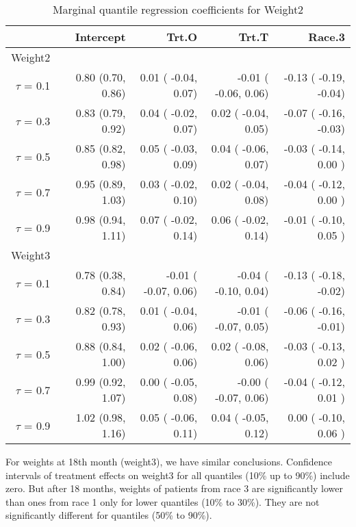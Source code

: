 \documentclass[12pt]{article}
\begin{document}
\begin{table}[ht]
  \renewcommand{\arraystretch}{1.3}
  \begin{center}
    \caption{Marginal quantile regression coefficients for
      Weight2}\label{tab:w2}
    \vspace{10pt}
    \begin{tabular}{rrrrr}
      \toprule
      & Intercept         & Trt.O                & Trt.T                & Race.3                \\
      \hline
      Weight2      &                   &                      &                      &                       \\
      $\tau$ = 0.1 & 0.80 (0.70, 0.86) & 0.01  ( -0.04, 0.07) & -0.01 ( -0.06, 0.06) & -0.13 ( -0.19, -0.04) \\
      $\tau$ = 0.3 & 0.83 (0.79, 0.92) & 0.04  ( -0.02, 0.07) & 0.02  ( -0.04, 0.05) & -0.07 ( -0.16, -0.03) \\
      $\tau$ = 0.5 & 0.85 (0.82, 0.98) & 0.05  ( -0.03, 0.09) & 0.04  ( -0.06, 0.07) & -0.03 ( -0.14, 0.00 ) \\
      $\tau$ = 0.7 & 0.95 (0.89, 1.03) & 0.03  ( -0.02, 0.10) & 0.02  ( -0.04, 0.08) & -0.04 ( -0.12, 0.00 ) \\
      $\tau$ = 0.9 & 0.98 (0.94, 1.11) & 0.07  ( -0.02, 0.14) & 0.06  ( -0.02, 0.14) & -0.01 ( -0.10, 0.05 ) \\
      Weight3      &                   &                      &                      &                       \\
      $\tau$ = 0.1 & 0.78 (0.38, 0.84) & -0.01 ( -0.07, 0.06) & -0.04 ( -0.10, 0.04) & -0.13 ( -0.18, -0.02) \\
      $\tau$ = 0.3 & 0.82 (0.78, 0.93) & 0.01  ( -0.04, 0.06) & -0.01 ( -0.07, 0.05) & -0.06 ( -0.16, -0.01) \\
      $\tau$ = 0.5 & 0.88 (0.84, 1.00) & 0.02  ( -0.06, 0.06) & 0.02  ( -0.08, 0.06) & -0.03 ( -0.13, 0.02 ) \\
      $\tau$ = 0.7 & 0.99 (0.92, 1.07) & 0.00  ( -0.05, 0.08) & -0.00 ( -0.07, 0.06) & -0.04 ( -0.12, 0.01 ) \\
      $\tau$ = 0.9 & 1.02 (0.98, 1.16) & 0.05  ( -0.06, 0.11) & 0.04  ( -0.05, 0.12) & 0.00  ( -0.10, 0.06 ) \\
      \bottomrule
    \end{tabular}
  \end{center}
\end{table}

For weights at 18th month (weight3), we have similar
conclusions. Confidence intervals of treatment effects on weight3 for
all quantiles (10\% up to 90\%) include zero. But after 18 months,
weights of patients from race 3 are significantly lower than ones from
race 1 only for lower quantiles (10\% to 30\%). They are not
significantly different for quantiles (50\% to 90\%).
\end{document}
